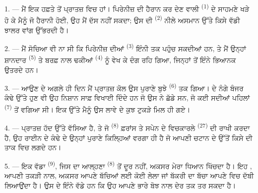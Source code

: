 
\VUsaut{4.0mm}
\VUsaut{3.0mm}

\VUsaut{3.0mm}

\VUsaut{3.0mm}

1. --- ਮੈਂ ਇਕ ਹਫ਼ਤੇ ਤੋਂ ਪ੍ਰਾਤਜ਼ ਵਿਚ ਹਾਂ। ਪਿਰੇਨੀਜ਼ ਦੀ ਹੈਰਾਨ ਕਰ ਦੇਣ ਵਾਲੀ
 \textsuperscript{(1)} ਦੇ ਸਾਹਮਣੇ ਖੜੇ ਹੋ ਕੇ ਮੈਨੂੰ ਜੋ ਹੈਰਾਨੀ ਹੋਈ,
ਉਹ ਮੈਂ ਦੱਸ ਨਹੀਂ ਸਕਦਾ; ਉਸ ਦੀ  \textsuperscript{(2)} ਨੀਲੇ
ਅਸਮਾਨ ਉੱਤੇ ਕਿਸੇ ਵੱਡੀ ਝਾਲਰ ਵਾਂਗ ਉੱਭਰਦੀ ਹੈ।

2. --- ਮੈਂ ਸੋਚਿਆ ਵੀ ਨਾ ਸੀ ਕਿ ਪਿਰੇਨੀਜ਼ ਦੀਆਂ  \textsuperscript{(3)}
ਇੰਨੀ  ਤਕ ਪਹੁੰਚ ਸਕਦੀਆਂ ਹਨ, ਤੇ ਮੈਂ ਉਨ੍ਹਾਂ ਸ਼ਾਨਦਾਰ
 \textsuperscript{(5)} ਤੇ ਬਰਫ਼ ਨਾਲ ਢਕੀਆਂ
 \textsuperscript{(4)} ਨੂੰ ਵੇਖ ਕੇ ਦੰਗ ਰਹਿ ਗਿਆ, ਜਿਨ੍ਹਾਂ ਤੋਂ ਇੰਨੇ
ਭਿਆਨਕ  ਉਤਰਦੇ ਹਨ।

\VUsaut{3.0mm}
\VUsaut{3.0mm}

3. --- ਆਉਣ ਦੇ ਅਗਲੇ ਹੀ ਦਿਨ ਮੈਂ ਪ੍ਰਾਤਜ਼ ਕੋਲ ਉਸ ਪੁਰਾਣੇ ਬੁਝੇ 
\textsuperscript{(6)} ਤਕ ਗਿਆ।  ਦੇ ਨੰਗੇ ਬੰਜਰ ਕੰਢੇ ਉੱਤੇ ਹੁਣ ਵੀ ਉਹ ਨਿਸ਼ਾਨ
ਸਾਫ਼ ਵਿਖਾਈ ਦਿੰਦੇ ਹਨ ਜੋ ਉਸ  ਨੇ ਛੱਡੇ ਸਨ, ਜੋ ਕਈ ਸਦੀਆਂ ਪਹਿਲਾਂ
 \textsuperscript{(7)} ਤੋਂ ਵਗਿਆ ਸੀ। ਇਕ  ਉੱਤੇ
ਮੈਨੂੰ ਉਸ ਲਾਵੇ ਦੇ ਕੁਝ ਟੁਕੜੇ ਮਿਲ ਹੀ ਗਏ।

4. --- ਪ੍ਰਾਤਜ਼ ਹੱਦ ਉੱਤੇ ਵੱਸਿਆ ਹੈ, ਤੇ ਜੋ  \textsuperscript{(8)}
ਫ਼ਰਾਂਸ ਤੇ ਸਪੇਨ ਦੇ ਵਿਚਕਾਰਲੇ  \textsuperscript{(27)} ਦੀ ਰਾਖੀ ਕਰਦਾ ਹੈ,
ਉਹ ਰਾਈਨ ਦੇ ਕੰਢੇ ਦੇ ਉਨ੍ਹਾਂ ਪੁਰਾਣੇ ਕਿਲ੍ਹਿਆਂ ਵਰਗਾ ਹੀ ਹੈ ਜੋ ਆਪਣੀ ਚਟਾਨ ਦੇ ਉੱਤੋਂ ਕਿਸੇ
 ਦੀ ਤਾਕ ਵਿਚ ਲਗਦੇ ਹਨ।

5. --- ਇਕ ਵੱਡਾ  \textsuperscript{(9)}, ਜਿਸ ਦਾ ਆਲ੍ਹਣਾ 
\textsuperscript{(8)} ਤੋਂ ਦੂਰ ਨਹੀਂ, ਅਕਸਰ ਮੇਰਾ ਧਿਆਨ ਖਿੱਚਦਾ ਹੈ। ਇਹ
, ਆਪਣੀ ਤਕੜੀ  ਨਾਲ, ਅਕਸਰ ਆਪਣੇ ਬੱਚਿਆਂ ਲਈ ਕੋਈ
ਲੇਲਾ ਜਾਂ ਬੱਕਰੀ ਦਾ ਬੱਚਾ ਆਪਣੇ  ਵਿਚ ਦੱਬੀ ਲਿਆਉਂਦਾ ਹੈ। ਉਸ ਦੇ
 ਇੰਨੇ ਵੱਡੇ ਹਨ ਕਿ ਉਹ ਆਪਣੇ ਭਾਰੇ ਬੋਝ ਨਾਲ ਦੇਰ ਤਕ ਤਰ ਸਕਦਾ ਹੈ।


